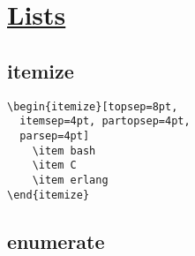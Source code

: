 \section{\href{https://www.overleaf.com/learn/latex/Lists}{Lists}}

\subsection*{itemize}
\begin{lstlisting}
\begin{itemize}[topsep=8pt,
  itemsep=4pt, partopsep=4pt, 
  parsep=4pt]
    \item bash
    \item C
    \item erlang
\end{itemize}
\end{lstlisting}

\subsection*{enumerate}

\ \\
